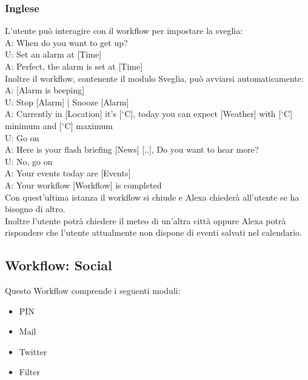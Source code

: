 \subsubsection{Inglese}
L'utente può interagire con il workflow per impostare la sveglia:\\
A: When do you want to get up?\\
U: Set an alarm at [Time]\\
A: Perfect, the alarm is set at [Time]\\

Inoltre il workflow, contenente il modulo Sveglia, può avviarsi automaticamente:\\
\newline
A: [Alarm is beeping]\\
U: Stop [Alarm] | Snooze [Alarm]\\
A: Currently in [Location] it's [$^\circ$C], today you can expect [Weather] with [$^\circ$C] minimum and [$^\circ$C] maximum\\
U: Go on\\
A: Here is your flash briefing [News] [..], Do you want to hear more?\\
U: No, go on\\
A: Your events today are [Events]\\
A: Your workflow [Workflow] is completed\\

Con quest'ultima istanza il workflow si chiude e Alexa chiederà all'utente se ha bisogno di altro.\\
Inoltre l'utente potrà chiedere il meteo di un'altra città oppure Alexa potrà rispondere che l'utente attualmente non dispone di eventi salvati nel calendario.

\subsection{Workflow: Social}
Questo Workflow comprende i seguenti moduli:
\begin{itemize}
	\item PIN
	\item Mail
	\item Twitter
	\item Filter
\end{itemize}
